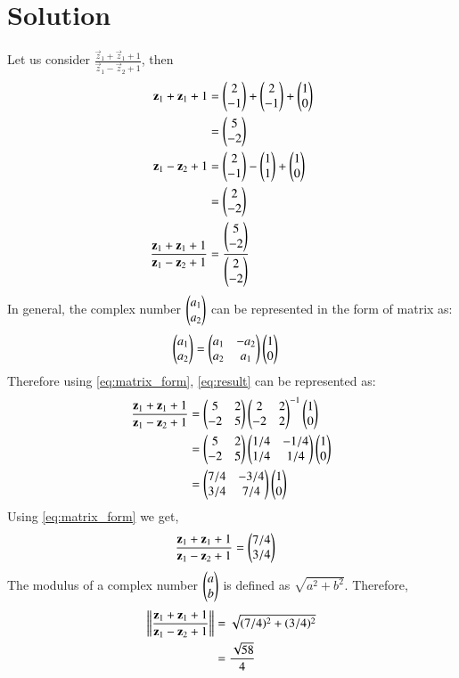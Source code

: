 \documentclass[journal,12pt,twocolumn]{IEEEtran}
\begin{document}
\section{Solution}
Let us consider $\frac{\vec{z}_1 + \vec{z}_1 + 1}{\vec{z}_1-\vec{z}_2+1}$, then
\begin{align}
	\mathbf{z}_1 + \mathbf{z}_1 + 1 &= \begin{pmatrix}2 \\ -1\end{pmatrix} + \begin{pmatrix} 2 \\ -1\end{pmatrix} + \begin{pmatrix} 1 \\ 0\end{pmatrix} \\
                  &= \begin{pmatrix}5 \\ -2\end{pmatrix}\\
	\mathbf{z}_1 - \mathbf{z}_2 + 1 &= \begin{pmatrix}2 \\ -1\end{pmatrix} - \begin{pmatrix} 1 \\ 1\end{pmatrix} + \begin{pmatrix} 1 \\ 0\end{pmatrix} \\
	&= \begin{pmatrix}2 \\ -2\end{pmatrix} \\ 
 	\frac{\mathbf{z}_1 + \mathbf{z}_1 + 1}{\mathbf{z}_1-\mathbf{z}_2+1} &= \frac{\begin{pmatrix}5 \\ -2\end{pmatrix}}{\begin{pmatrix}2 \\ -2\end{pmatrix}}\label{eq:result} 
\end{align}
In general, the complex number $\begin{pmatrix}a_1 \\ a_2\end{pmatrix}$ can be represented in the form of matrix as:
\begin{align} \label{eq:matrix_form}
	\begin{pmatrix}a_1 \\ a_2\end{pmatrix} &= \begin{pmatrix} a_1 & -a_2 \\ a_2 & a_1\end{pmatrix}\begin{pmatrix}1 \\ 0\end{pmatrix}
\end{align}
Therefore using \eqref{eq:matrix_form}, \eqref{eq:result} can be represented as:
\begin{align}
\frac{\mathbf{z}_1 + \mathbf{z}_1 + 1}{\mathbf{z}_1-\mathbf{z}_2+1}	&=\begin{pmatrix}5 & 2\\ -2 & 5\end{pmatrix} \begin{pmatrix}2 & 2\\ -2 & 2\end{pmatrix} ^{-1} \begin{pmatrix}1 \\ 0\end{pmatrix}\\
	&= \begin{pmatrix}5 & 2\\ -2 & 5\end{pmatrix} \begin{pmatrix}1/4 & -1/4 \\ 1/4 & 1/4\end{pmatrix} \begin{pmatrix}1 \\ 0\end{pmatrix}\\
	&= \begin{pmatrix}7/4 & -3/4 \\ 3/4 & 7/4\end{pmatrix} \begin{pmatrix}1\\0\end{pmatrix} \label{eq:res2} \end{align}
Using \eqref{eq:matrix_form} we get,
\begin{align}
\frac{\mathbf{z}_1 + \mathbf{z}_1 + 1}{\mathbf{z}_1-\mathbf{z}_2+1}	&= \begin{pmatrix}7/4 \\ 3/4\end{pmatrix}
\end{align}
The modulus of a complex number $\begin{pmatrix}a \\ b\end{pmatrix}$ is defined as $\sqrt{a^{2} + b^{2}}$.
Therefore, 
\begin{align}
	\left\lVert\frac{\mathbf{z}_1 + \mathbf{z}_1 + 1}{\mathbf{z}_1-\mathbf{z}_2+1}\right\rVert &= \sqrt{(7/4)^{2} + (3/4)^{2}} \\ 
	&= \frac{\sqrt{58}}{4}
\end{align}
\end{document}
